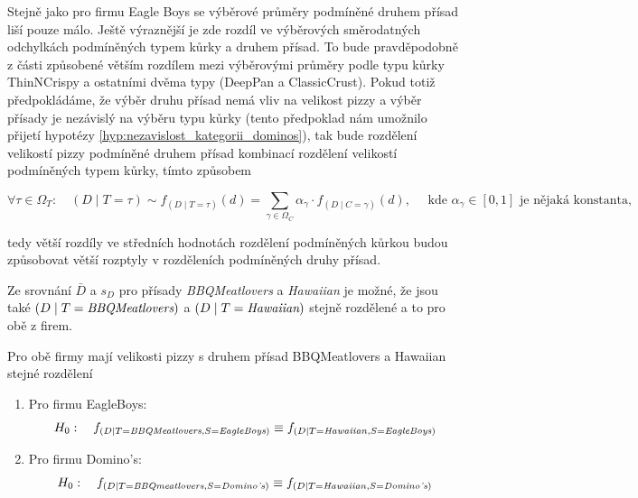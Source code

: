 \documentclass[czech]{article}
\begin{document}
\begin{table}[H]
	\caption{Základní statistiky velikosti pizz podmíněné přísadou pro firmu Domino's}
\end{table}

Stejně jako pro firmu Eagle Boys se výběrové průměry podmíněné druhem přísad liší pouze
málo. Ještě výraznější je zde rozdíl ve výběrových směrodatných odchylkách podmíněných typem kůrky a druhem
přísad. To bude pravděpodobně z části způsobené větším rozdílem mezi výběrovými průměry podle
typu kůrky ThinNCrispy a ostatními dvěma typy (DeepPan a ClassicCrust). Pokud
totiž předpokládáme, že výběr druhu přísad nemá vliv na velikost pizzy a výběr přísady je nezávislý na
výběru typu kůrky (tento předpoklad nám umožnilo přijetí hypotézy \ref{hyp:nezavislost_kategorii_dominos}), tak bude rozdělení velikostí pizzy podmíněné druhem přísad  kombinací rozdělení
velikostí podmíněných typem kůrky, tímto způsobem

\[
	\forall \tau \in \Omega_T: \quad  \left( D \mid T = \tau \right) \sim f_{\left(  D \mid T = \tau \right)}(d) = \sum_{\gamma \in \Omega_C} \alpha_{\gamma} \cdot f_{\left(  D \mid C
			= \gamma \right)}(d), \quad \text{ kde } \alpha_{\gamma} \in [0,1] \text{ je nějaká konstanta},
\]

\noindent tedy větší rozdíly ve středních hodnotách rozdělení podmíněných kůrkou budou způsobovat větší rozptyly v rozděleních podmíněných druhy přísad.

Ze srovnání \(\bar{D}\) a \(s_{D}\) pro přísady \emph{BBQMeatlovers} a \emph{Hawaiian}
je možné, že jsou také \( \left( D \mid T = \emph{BBQMeatlovers} \right)\) a \linebreak \(\left( D \mid T = \emph{Hawaiian} \right)\) stejně
rozdělené a to pro obě z firem.

\begin{hypothesis}
	\label{hyp:stejne_rozdeleni_bbq_a_haw}
	Pro obě firmy mají velikosti pizzy s druhem přísad BBQMeatlovers a Hawaiian
	stejné rozdělení
	\begin{enumerate}[label = (\alph*)]
		\item Pro firmu EagleBoys:
		      \label{hyp:stejne_rozdeleni_bbq_a_haw_eb}
		      \[
			      H_0: \quad f_{\left( D \mid T = \text{\emph{BBQMeatlovers}}, S =
					      \text{\emph{EagleBoys}} \right)} \equiv f_{\left( D
					      \mid T = \text{\emph{Hawaiian}}, S = \text{\emph{EagleBoys}} \right)}
		      \]
		\item Pro firmu Domino's:
		      \label{hyp:stejne_rozdeleni_bbq_a_haw_d}
		      \[
			      H_0: \quad f_{\left( D \mid T = \text{\emph{BBQmeatlovers}}, S =
					      \text{\emph{Domino's}} \right)} \equiv f_{\left( D \mid T = \text{\emph{Hawaiian}}, S =
					      \text{\emph{Domino's}} \right)}
		      \]
	\end{enumerate}
\end{hypothesis}
\end{document}
